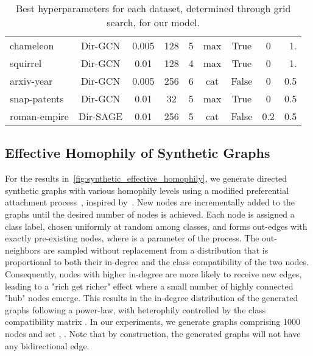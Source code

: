 \documentclass{article}
\theoremstyle{plain}
\theoremstyle{definition}
\theoremstyle{remark}
\begin{document}
\begin{table*}[t]
\begin{center}
\begin{small}
\begin{sc}
{\begin{tabular}{lcccccccr}
        \midrule
        chameleon     &  Dir-GCN    & 0.005  &     128         &    5           &  max  & True  &  0      & 1. \\
        squirrel      &  Dir-GCN    & 0.01   &     128         &    4           &  max  & True  &  0      & 1. \\
        arxiv-year    &  Dir-GCN    & 0.005  &     256         &     6          &  cat  & False &  0      & 0.5 \\
        snap-patents  &  Dir-GCN    & 0.01   &     32          &     5          &   max & True  &  0      & 0.5 \\
        roman-empire  &  Dir-SAGE   & 0.01   &     256         &     5          &   cat & False &  0.2    & 0.5 \\
        \bottomrule
    \end{tabular}
    }
\end{sc}
\end{small}
\end{center}
\caption{Best hyperparameters for each dataset, determined through grid search, for our model.}
\label{tab:best_hyperparameters}
\end{table*} 
\subsection{Effective Homophily of Synthetic Graphs}  \label{sec:effective_homophily_synthetic}
For the results in~\cref{fig:synthetic_effective_homophily}, we generate directed synthetic graphs with various homophily levels using a modified preferential attachment process~\cite{Barabasi99emergenceScaling}, inspired by~\citet{zhu2020beyond}. New nodes are incrementally added to the graphs until the desired number of nodes is achieved. Each node is assigned a class label, chosen uniformly at random among  classes, and forms out-edges with exactly  pre-existing nodes, where  is a parameter of the process. The  out-neighbors are sampled without replacement from a distribution that is proportional to both their in-degree and the class compatibility of the two nodes. Consequently, nodes with higher in-degree are more likely to receive new edges, leading to a "rich get richer" effect where a small number of highly connected "hub" nodes emerge. This results in the in-degree distribution of the generated graphs following a power-law, with heterophily controlled by the class compatibility matrix . In our experiments, we generate graphs comprising 1000 nodes and set , . Note that by construction, the generated graphs will not have any bidirectional edge.
\end{document}
